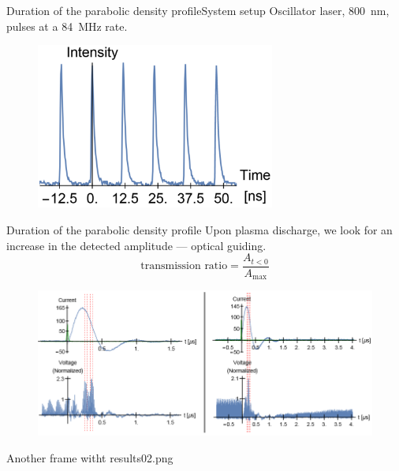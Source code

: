 \documentclass[]{beamer}
\begin{document}
  \begin{frame}{Duration of the parabolic density profile}{System setup}
    Oscillator laser, \SI{800}{\nm}, pulses at a \SI{84}{\MHz} rate.
    \begin{figure}
      \includegraphics[width=0.7\textwidth]{figures/results/oscillator/single.PNG}
    \end{figure}
  \end{frame}
  \begin{frame}{Duration of the parabolic density profile}
    Upon plasma discharge, we look for an increase in the detected amplitude --- optical guiding.
    \begin{equation*}
      \text{transmission ratio} = \frac{A_{t<0}}{A_\text{max}}
    \end{equation*}
    \begin{figure}
      \includegraphics[width=\textwidth]{figures/results/oscillator/results01.PNG}
    \end{figure}
  \end{frame}
  \begin{frame}
    Another frame witht results02.png
  \end{frame}
\end{document}
